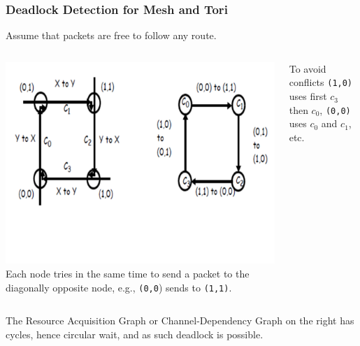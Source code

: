\documentclass{beamer}
\newcommand{\emp}[1]{\textcolor{DikuRed}{ #1}}
\begin{document}
\begin{frame}[fragile,t]
\frametitle{Deadlock Detection for Mesh and Tori}

\alert{Assume that packets are free to follow any route.}
\medskip

\begin{columns}
\includegraphics[width=44ex]{Figures/FigsInterconnect/DeadlockAvoid1}
Each node tries in the same time to send 
a packet to the diagonally opposite node, 
e.g., {\tt(0,0}) sends to {\tt(1,1)}.
\medskip

To avoid conflicts {\tt(1,0)} uses first $c_3$ then $c_0$, 
{\tt(0,0)} uses $c_0$ and $c_1$, etc.\\{\tt~~}\\{\tt~~}\\{\tt~~}
\end{columns}
\vspace{-5ex}

The Resource Acquisition Graph or \emp{Channel-Dependency Graph}
on the right \alert{has cycles}, hence circular wait, and as such 
\alert{deadlock is possible}.

\end{frame}
\end{document}
